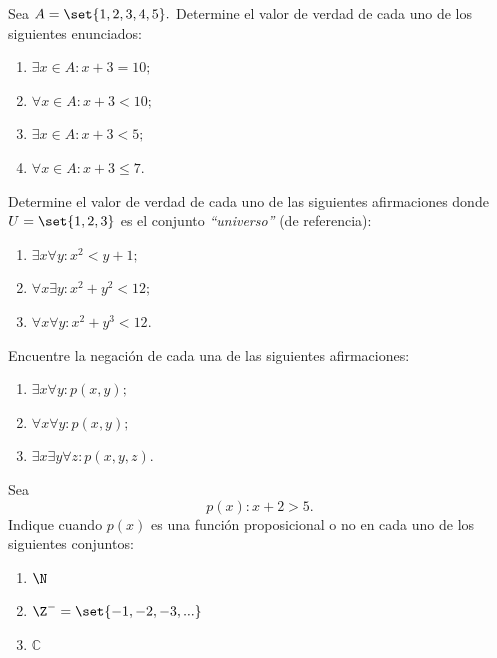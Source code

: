 

\begin{problema}
	Sea $A=\set{1,2,3,4,5}.$ Determine el valor de verdad de cada uno de los siguientes enunciados:
	\begin{enumerate}
		\item $\exists x \in A: x+3=10;$ 
		\item $\forall x \in A: x+3<10;$ 
		\item $\exists x \in A: x+3<5;$ 
		\item $\forall x \in A: x+3 \leq 7.$
	\end{enumerate}
	
\end{problema}




\begin{problema}
	Determine el valor de verdad de cada uno de las siguientes afirmaciones donde $U=\set{1,2,3}$ es el conjunto \emph{``universo''} (de referencia):
	\begin{enumerate}
		\item $\exists x \forall y: x^{2}< y+1;$ 
		\item $\forall x \exists y: x^{2}+y^{2}<12;$ 
		\item $\forall x \forall y: x^{2}+y^{3}<12.$
	\end{enumerate}
	
\end{problema}




\begin{problema}
	Encuentre la negación de cada una de las siguientes afirmaciones:
	\begin{enumerate}
		\item $\exists x \forall y: p(x,y);$ 
		\item $\forall x \forall y: p(x,y);$ 
		\item $\exists x \exists y \forall z: p(x,y,z).$
	\end{enumerate}
	
\end{problema}




\begin{problema}
	Sea $$p(x): x+2>5.$$ Indique cuando $p(x)$ es una función proposicional o no en cada uno de los siguientes conjuntos: 
	\begin{enumerate}
		\item $\N$ 
		\item $\Z^{-}=\set{-1,-2,-3,...}$ 
		\item $\mathbb{C}$
	\end{enumerate}
	
\end{problema}




